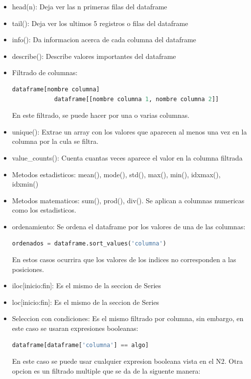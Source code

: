 \documentclass{article}
\begin{document}
\begin{itemize}
    \item head(n): Deja ver las n primeras filas del dataframe
    \item tail(): Deja ver los ultimos 5 registros o filas del dataframe
    \item info(): Da informacion acerca de cada columna del dataframe
    \item describe(): Describe valores importantes del dataframe
    \item Filtrado de columnas: 
        \begin{lstlisting}[language=Python, caption= Filtrado de columnas]
            dataframe[nombre columna]
            dataframe[[nombre columna 1, nombre columna 2]]
        \end{lstlisting}
        En este filtrado, se puede hacer por una o varias columnas.
    \item unique(): Extrae un array con los valores que aparecen al menos una vez en la columna por la cula se filtra.
    \item value\_counts(): Cuenta cuantas veces aparece el valor en la columna filtrada
    \item Metodos estadisticos: mean(), mode(), std(), max(), min(), idxmax(), idxmin()
    \item Metodos matematicos: sum(), prod(), div(). Se aplican a columnas numericas como los estadisticos.
    \item ordenamiento: Se ordena el dataframe por los valores de una de las columnas:
        \begin{lstlisting}[language=Python, caption= Ordenamiento por una columna]
            ordenados = dataframe.sort_values('columna')
        \end{lstlisting}
        En estos casos ocurrira que los valores de los indices no corresponden a las posiciones.
    \item iloc[inicio:fin]: Es el mismo de la seccion de Series
    \item loc[inicio:fin]: Es el mismo de la seccion de Series
    \item Seleccion con condiciones: Es el mismo filtrado por columna, sin embargo, en este caso se usaran expresiones booleanas:
        \begin{lstlisting}[language=Python, caption= Filtrado Booleano]
            dataframe[dataframe['columna'] == algo]
        \end{lstlisting}
        En este caso se puede usar cualquier expresion booleana vista en el N2. Otra opcion es un filtrado multiple que se da de la siguente manera:

\end{itemize}
\end{document}
